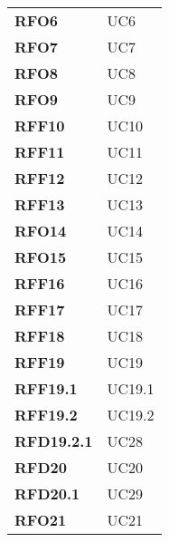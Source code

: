 \begin{longtable}[H]{>{\centering\bfseries}m{8cm} >{\centering\arraybackslash}m{8cm}}
  \textbf{RFO6} & UC6 \\
  \textbf{RFO7} & UC7 \\
  \textbf{RFO8} & UC8 \\
  \textbf{RFO9} & UC9 \\
  \textbf{RFF10} & UC10 \\
  \textbf{RFF11} & UC11 \\
  \textbf{RFF12} & UC12 \\
  \textbf{RFF13} & UC13 \\
  \textbf{RFO14} & UC14 \\
  \textbf{RFO15} & UC15 \\
  \textbf{RFF16} & UC16 \\
  \textbf{RFF17} & UC17 \\
  \textbf{RFF18} & UC18 \\
  \textbf{RFF19} & UC19 \\
  \textbf{RFF19.1} & UC19.1 \\
  \textbf{RFF19.2} & UC19.2 \\
  \textbf{RFD19.2.1} & UC28 \\
  \textbf{RFD20} & UC20 \\
  \textbf{RFD20.1} & UC29 \\
  \textbf{RFO21} & UC21 \\

\end{longtable}
